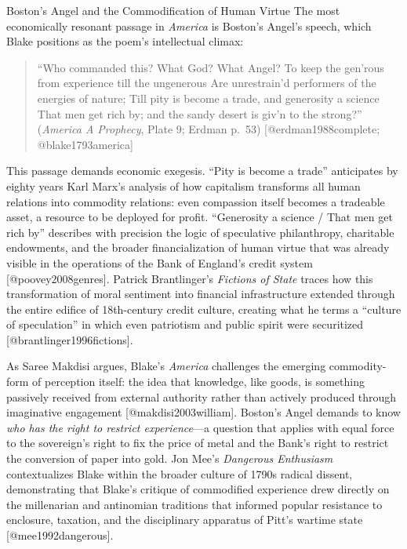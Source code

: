\documentclass[
  ignorenonframetext,
]{beamer}
\begin{document}
\begin{frame}{Boston's Angel and the Commodification of Human Virtue}
\protect{}\label{bostons-angel-and-the-commodification-of-human-virtue}
The most economically resonant passage in \emph{America} is Boston's
Angel's speech, which Blake positions as the poem's intellectual climax:

\begin{quote}
``Who commanded this? What God? What Angel? To keep the gen'rous from
experience till the ungenerous Are unrestrain'd performers of the
energies of nature; Till pity is become a trade, and generosity a
science That men get rich by; and the sandy desert is giv'n to the
strong?'' (\emph{America A Prophecy}, Plate 9; Erdman p.~53)
{[}@erdman1988complete; @blake1793america{]}
\end{quote}

This passage demands economic exegesis. ``Pity is become a trade''
anticipates by eighty years Karl Marx's analysis of how capitalism
transforms all human relations into commodity relations: even compassion
itself becomes a tradeable asset, a resource to be deployed for profit.
``Generosity a science / That men get rich by'' describes with precision
the logic of speculative philanthropy, charitable endowments, and the
broader financialization of human virtue that was already visible in the
operations of the Bank of England's credit system
{[}@poovey2008genres{]}. Patrick Brantlinger's \emph{Fictions of State}
traces how this transformation of moral sentiment into financial
infrastructure extended through the entire edifice of 18th-century
credit culture, creating what he terms a ``culture of speculation'' in
which even patriotism and public spirit were securitized
{[}@brantlinger1996fictions{]}.

As Saree Makdisi argues, Blake's \emph{America} challenges the emerging
commodity-form of perception itself: the idea that knowledge, like
goods, is something passively received from external authority rather
than actively produced through imaginative engagement
{[}@makdisi2003william{]}. Boston's Angel demands to know \emph{who has
the right to restrict experience}---a question that applies with equal
force to the sovereign's right to fix the price of metal and the Bank's
right to restrict the conversion of paper into gold. Jon Mee's
\emph{Dangerous Enthusiasm} contextualizes Blake within the broader
culture of 1790s radical dissent, demonstrating that Blake's critique of
commodified experience drew directly on the millenarian and antinomian
traditions that informed popular resistance to enclosure, taxation, and
the disciplinary apparatus of Pitt's wartime state
{[}@mee1992dangerous{]}.
\end{frame}
\end{document}

